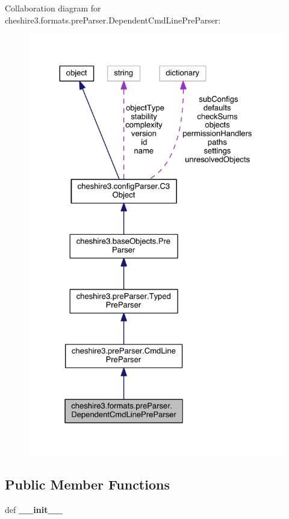 Collaboration diagram for cheshire3.\-formats.\-pre\-Parser.\-Dependent\-Cmd\-Line\-Pre\-Parser\-:
\nopagebreak
\begin{figure}[H]
\begin{center}
\leavevmode
\includegraphics[width=325pt]{classcheshire3_1_1formats_1_1pre_parser_1_1_dependent_cmd_line_pre_parser__coll__graph}
\end{center}
\end{figure}
\subsection*{Public Member Functions}
\begin{DoxyCompactItemize}
\item 
\hypertarget{classcheshire3_1_1formats_1_1pre_parser_1_1_dependent_cmd_line_pre_parser_af3aae7c5080122648f3cbd1fc2941099}{def {\bfseries \-\_\-\-\_\-init\-\_\-\-\_\-}}\label{classcheshire3_1_1formats_1_1pre_parser_1_1_dependent_cmd_line_pre_parser_af3aae7c5080122648f3cbd1fc2941099}

\end{DoxyCompactItemize}
